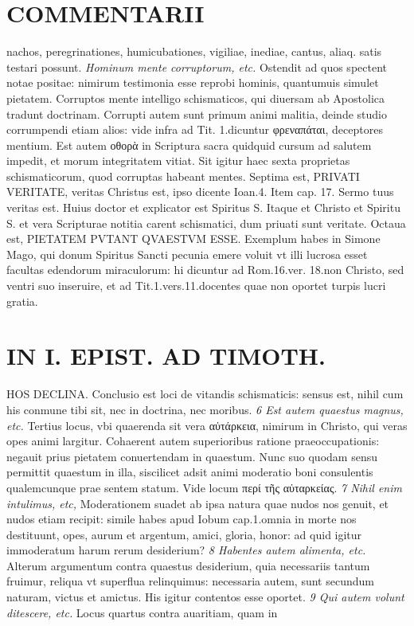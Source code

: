 \documentclass{article}
\begin{document}
\begin{pages}
\section*{COMMENTARII }
\marginpar{[ p.154 ]}\pstart nachos, peregrinationes, humicubationes, vigiliae, inediae, cantus, aliaq. satis testari possunt.  \pend
\textit{Hominum mente corruptorum, etc. }\pstart Ostendit ad quos spectent notae positae: nimirum testimonia esse reprobi hominis, quantumuis simulet pietatem. Corruptos mente intelligo schismaticos, qui diuersam ab Apostolica tradunt doctrinam. Corrupti autem sunt primum animi malitia, deinde studio corrumpendi etiam alios: vide infra ad Tit. 1.dicuntur φρεναπάται, deceptores mentium.  \pend\pstart Est autem οθορὰ in Scriptura sacra quidquid cursum ad salutem impedit, et morum integritatem vitiat. Sit igitur haec sexta proprietas schismaticorum, quod corruptas habeant mentes.  \pend\pstart Septima est, PRIVATI VERITATE, veritas Christus est, ipso dicente Ioan.4. Item cap. 17. Sermo tuus veritas est. Huius doctor et explicator est Spiritus S. Itaque et Christo et Spiritu S. et vera Scripturae notitia carent schismatici, dum priuati sunt veritate.  \pend\pstart Octaua est, PIETATEM PVTANT QVAESTVM ESSE. Exemplum habes in Simone Mago, qui donum Spiritus Sancti pecunia emere voluit vt illi lucrosa esset facultas edendorum miraculorum: hi dicuntur ad Rom.16.ver. 18.non Christo, sed ventri suo inseruire, et ad Tit.1.vers.11.docentes quae non oportet turpis lucri gratia.  \pend
\section*{IN I. EPIST. AD TIMOTH. }
\marginpar{[ p.155 ]}\pstart HOS DECLINA. Conclusio est loci de vitandis schismaticis: sensus est, nihil cum his conmune tibi sit, nec in doctrina, nec moribus.  \pend
\textit{6 Est autem quaestus magnus, etc. }\pstart Tertius locus, vbi quaerenda sit vera αὐτάρκεια, nimirum in Christo, qui veras opes animi largitur. Cohaerent autem superioribus ratione praeoccupationis: negauit prius pietatem conuertendam in quaestum. Nunc suo quodam sensu permittit quaestum in illa, siscilicet adsit animi moderatio boni consulentis qualemcunque prae sentem statum. Vide locum περί τῆς αὐταρκείας.  \pend
\textit{7 Nihil enim intulimus, etc, }\pstart Moderationem suadet ab ipsa natura quae nudos nos genuit, et nudos etiam recipit: simile habes apud Iobum cap.1.omnia in morte nos destituunt, opes, aurum et argentum, amici, gloria, honor: ad quid igitur immoderatum harum rerum desiderium?  \pend
\textit{8 Habentes autem alimenta, etc. }\pstart Alterum argumentum contra quaestus desiderium, quia necessariis tantum fruimur, reliqua vt superflua relinquimus: necessaria autem, sunt secundum naturam, victus et amictus. His igitur contentos esse oportet.  \pend
\textit{9 Qui autem volunt ditescere, etc. }\pstart Locus quartus contra auaritiam, quam in  \pend

\end{pages}
\end{document}
